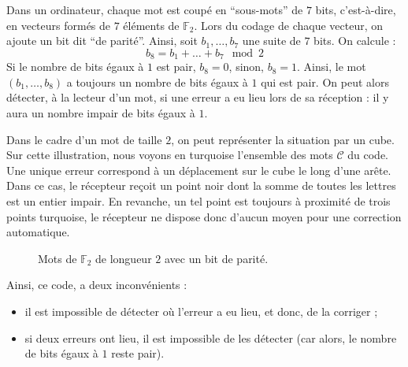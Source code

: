 	\begin{example}
		Dans un ordinateur, chaque mot est coupé en ``sous-mots'' de $7$ bits, c'est-à-dire, en vecteurs formés de $7$ éléments de $\mathbb{F}_2$. Lors du codage de chaque vecteur, on ajoute un bit dit ``de parité''.
		\newpar
		Ainsi, soit $b_1, \dots, b_7$ une suite de $7$ bits. On calcule :
		\[ b_8 = b_1 + \dots + b_7 \mod 2 \]
		Si le nombre de bits égaux à $1$ est pair, $b_8 = 0$, sinon, $b_8 = 1$. Ainsi, le mot $(b_1, \dots, b_8)$ a toujours un nombre de bits égaux à $1$ qui est pair. On peut alors détecter, à la lecteur d'un mot, si une erreur a eu lieu lors de sa réception : il y aura un nombre impair de bits égaux à $1$.
		\newpar
		\begin{minipage}{0.45\textwidth}
			Dans le cadre d'un mot de taille $2$, on peut représenter la situation par un cube. Sur cette illustration, nous voyons en turquoise l'ensemble des mots $\mathcal{C}$ du code. Une unique erreur correspond à un déplacement sur le cube le long d'une arête. Dans ce cas, le récepteur reçoit un point noir dont la somme de toutes les lettres est un entier impair. En revanche, un tel point est toujours à proximité de trois points turquoise, le récepteur ne dispose donc d'aucun moyen pour une correction automatique.
		\end{minipage}
		\hfill
		\begin{minipage}{0.45\textwidth}
			\begin{figure}[H]
				\begin{center}
				\end{center}
				\caption{Mots de $\mathbb{F}_2$ de longueur $2$ avec un bit de parité.}
			\end{figure}
		\end{minipage}
		\newpar
		Ainsi, ce code, a deux inconvénients :
		\begin{itemize}
			\item il est impossible de détecter où l'erreur a eu lieu, et donc, de la corriger ;
			\item si deux erreurs ont lieu, il est impossible de les détecter (car alors, le nombre de bits égaux à $1$ reste pair).
		\end{itemize}
	\end{example}
	
